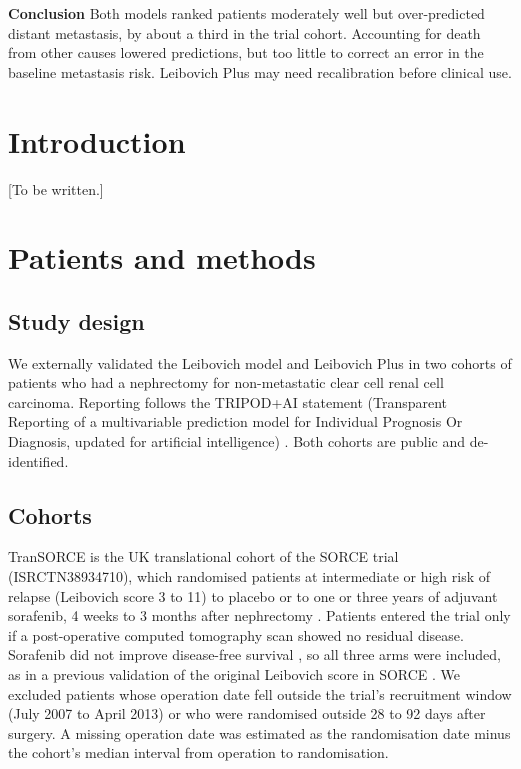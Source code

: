 \documentclass[11pt,a4paper]{article}
\begin{document}
\textbf{Conclusion} Both models ranked patients moderately well but over-predicted distant metastasis, by about a third in the trial cohort. Accounting for death from other causes lowered predictions, but too little to correct an error in the baseline metastasis risk. Leibovich Plus may need recalibration before clinical use.

\section*{Introduction}

[To be written.]

\section*{Patients and methods}

\subsection*{Study design}

We externally validated the Leibovich model \cite{Leibovich_2003} and Leibovich Plus \cite{Stimpson_2025} in two cohorts of patients who had a nephrectomy for non-metastatic clear cell renal cell carcinoma.
Reporting follows the TRIPOD+AI statement (Transparent Reporting of a multivariable prediction model for Individual Prognosis Or Diagnosis, updated for artificial intelligence) \cite{Collins_2024}.
Both cohorts are public and de-identified.

\subsection*{Cohorts}

TranSORCE is the UK translational cohort \cite{Abdullah_2026} of the SORCE trial (ISRCTN38934710), which randomised patients at intermediate or high risk of relapse (Leibovich score 3 to 11) to placebo or to one or three years of adjuvant sorafenib, 4 weeks to 3 months after nephrectomy \cite{Eisen_2020}.
Patients entered the trial only if a post-operative computed tomography scan showed no residual disease.
Sorafenib did not improve disease-free survival \cite{Eisen_2020}, so all three arms were included, as in a previous validation of the original Leibovich score in SORCE \cite{Oza_2022}.
We excluded patients whose operation date fell outside the trial's recruitment window (July 2007 to April 2013) or who were randomised outside 28 to 92 days after surgery.
A missing operation date was estimated as the randomisation date minus the cohort's median interval from operation to randomisation.
\end{document}
